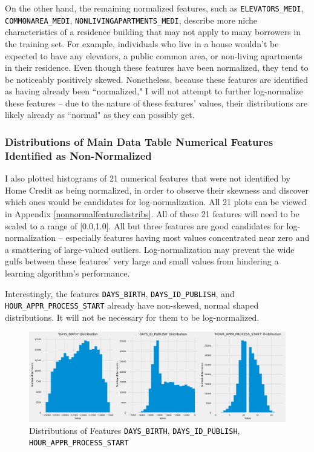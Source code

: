 \documentclass[12pt, letterpaper]{article}
\begin{document}
On the other hand, the remaining normalized features, such as \colorbox{backcolor}{\textcolor{black}{\texttt{ELEVATORS_MEDI}}}, \colorbox{backcolor}{\textcolor{black}{\texttt{COMMONAREA_MEDI}}}, \colorbox{backcolor}{\textcolor{black}{\texttt{NONLIVINGAPARTMENTS_MEDI}}}, describe more niche characteristics of a residence building that may not apply to many borrowers in the training set. For example, individuals who live in a house wouldn't be expected to have any elevators, a public common area, or non-living apartments in their residence. Even though these features have been normalized, they tend to be noticeably positively skewed. Nonetheless, because these features are identified as having already been ``normalized," I will not attempt to further log-normalize these features -- due to the nature of these features' values, their distributions are likely already as ``normal" as they can possibly get.

\subsubsection{Distributions of Main Data Table Numerical Features Identified as Non-Normalized}
I also plotted histograms of 21 numerical features that were not identified by Home Credit as being normalized, in order to observe their skewness and discover which ones would be candidates for log-normalization. All 21 plots can be viewed in Appendix \ref{nonnormalfeaturedistribs}. All of these 21 features will need to be scaled to a range of [0.0,1.0]. All but three features are good candidates for log-normalization -- especially features having most values concentrated near zero and a smattering of large-valued outliers. Log-normalization may prevent the wide gulfs between these features' very large and small values from hindering a learning algorithm's performance.

Interestingly, the features \colorbox{backcolor}{\textcolor{black}{\texttt{DAYS_BIRTH}}}, \colorbox{backcolor}{\textcolor{black}{\texttt{DAYS_ID_PUBLISH}}}, and \colorbox{backcolor}{\textcolor{black}{\texttt{HOUR_APPR_PROCESS_START}}} already have non-skewed, normal shaped distributions. It will not be necessary for them to be log-normalized.

\pagebreak

\begin{figure}[h!]
\includegraphics[width=\textwidth]{distribsDAYSBIRTHDAYSIDPUBLISHHOURAPPRPROCESSSTART}
\centering
\caption{Distributions of Features \colorbox{backcolor}{\textcolor{black}{\texttt{DAYS_BIRTH}}}, \colorbox{backcolor}{\textcolor{black}{\texttt{DAYS_ID_PUBLISH}}}, \colorbox{backcolor}{\textcolor{black}{\texttt{HOUR_APPR_PROCESS_START}}}}
\end{figure}
\end{document}
